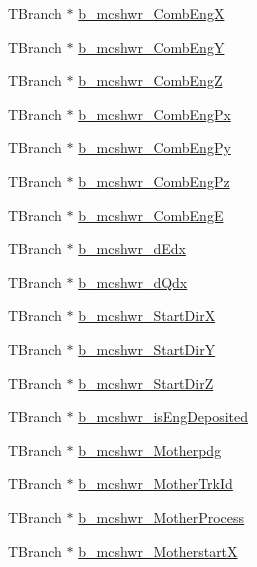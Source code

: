 \begin{DoxyCompactItemize}
T\-Branch $\ast$ \hyperlink{classanatree_ac04c6ed854dc843c7669464bc9213bfe}{b\-\_\-mcshwr\-\_\-\-Comb\-Eng\-X}
\item 
T\-Branch $\ast$ \hyperlink{classanatree_a8b699bb09b5e8efe0d491f198c7bb17d}{b\-\_\-mcshwr\-\_\-\-Comb\-Eng\-Y}
\item 
T\-Branch $\ast$ \hyperlink{classanatree_adb0b2f599653ea4893edb50eaf646acb}{b\-\_\-mcshwr\-\_\-\-Comb\-Eng\-Z}
\item 
T\-Branch $\ast$ \hyperlink{classanatree_a7f0321710f461fa2e1a0f3e73189dbd5}{b\-\_\-mcshwr\-\_\-\-Comb\-Eng\-Px}
\item 
T\-Branch $\ast$ \hyperlink{classanatree_a76d59f3fbd55ce8baf0813d93da07714}{b\-\_\-mcshwr\-\_\-\-Comb\-Eng\-Py}
\item 
T\-Branch $\ast$ \hyperlink{classanatree_a78b707886390b136e83f8361897d220a}{b\-\_\-mcshwr\-\_\-\-Comb\-Eng\-Pz}
\item 
T\-Branch $\ast$ \hyperlink{classanatree_a8203053f351487a426e1ed9299626dc4}{b\-\_\-mcshwr\-\_\-\-Comb\-Eng\-E}
\item 
T\-Branch $\ast$ \hyperlink{classanatree_aaa57724d50b85e3c964905ecaac4c4b9}{b\-\_\-mcshwr\-\_\-d\-Edx}
\item 
T\-Branch $\ast$ \hyperlink{classanatree_ad8ebcc8a56bab0d99a47cb13d988efb6}{b\-\_\-mcshwr\-\_\-d\-Qdx}
\item 
T\-Branch $\ast$ \hyperlink{classanatree_aec55c54119f47ad907c13579640ad906}{b\-\_\-mcshwr\-\_\-\-Start\-Dir\-X}
\item 
T\-Branch $\ast$ \hyperlink{classanatree_a4460a1575db87d63cda2782ad57b237b}{b\-\_\-mcshwr\-\_\-\-Start\-Dir\-Y}
\item 
T\-Branch $\ast$ \hyperlink{classanatree_aec48d161ed6a33b6355e2f34ef58ea7a}{b\-\_\-mcshwr\-\_\-\-Start\-Dir\-Z}
\item 
T\-Branch $\ast$ \hyperlink{classanatree_aa36739a0cd243fb9786eb10256c1f28e}{b\-\_\-mcshwr\-\_\-is\-Eng\-Deposited}
\item 
T\-Branch $\ast$ \hyperlink{classanatree_a0da88919223088d7cc6b5a52cdaa1c20}{b\-\_\-mcshwr\-\_\-\-Motherpdg}
\item 
T\-Branch $\ast$ \hyperlink{classanatree_a0c2b924c05f4a0c565374f5b4babe628}{b\-\_\-mcshwr\-\_\-\-Mother\-Trk\-Id}
\item 
T\-Branch $\ast$ \hyperlink{classanatree_a43f057eb7884467afa4a17a3e285fa8f}{b\-\_\-mcshwr\-\_\-\-Mother\-Process}
\item 
T\-Branch $\ast$ \hyperlink{classanatree_af0927811ef04a77ee14c25e02e384eff}{b\-\_\-mcshwr\-\_\-\-Motherstart\-X}

\end{DoxyCompactItemize}
